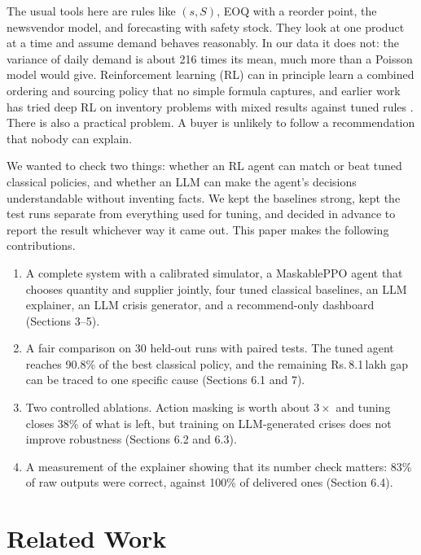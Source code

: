\documentclass[10pt,twocolumn]{article}
\newcommand{\Rs}{\mbox{Rs.}\,}
\newcommand{\lakh}{\,lakh}
\begin{document}
The usual tools here are rules like $(s,S)$, EOQ with a reorder point, the
newsvendor model, and forecasting with safety stock. They look at one product
at a time and assume demand behaves reasonably. In our data it does not: the
variance of daily demand is about 216 times its mean, much more than a Poisson
model would give. Reinforcement learning (RL) can in principle learn a combined
ordering and sourcing policy that no simple formula captures, and earlier work
has tried deep RL on inventory problems with mixed results against tuned rules
\cite{gijsbrechts,beer}. There is also a practical problem. A buyer is unlikely
to follow a recommendation that nobody can explain.

We wanted to check two things: whether an RL agent can match or beat tuned
classical policies, and whether an LLM can make the agent's decisions
understandable without inventing facts. We kept the baselines strong, kept the
test runs separate from everything used for tuning, and decided in advance to
report the result whichever way it came out. This paper makes the following
contributions.
\begin{enumerate}
  \item A complete system with a calibrated simulator, a MaskablePPO agent that
    chooses quantity and supplier jointly, four tuned classical baselines, an
    LLM explainer, an LLM crisis generator, and a recommend-only dashboard
    (Sections 3--5).
  \item A fair comparison on 30 held-out runs with paired tests. The tuned
    agent reaches 90.8\% of the best classical policy, and the remaining
    \Rs 8.1\lakh{} gap can be traced to one specific cause (Sections 6.1
    and 7).
  \item Two controlled ablations. Action masking is worth about $3\times$ and
    tuning closes 38\% of what is left, but training on LLM-generated crises
    does not improve robustness (Sections 6.2 and 6.3).
  \item A measurement of the explainer showing that its number check matters:
    83\% of raw outputs were correct, against 100\% of delivered ones
    (Section 6.4).
\end{enumerate}

\section{Related Work}
\end{document}
